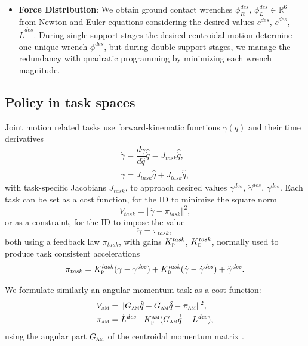 \documentclass[letterpaper, 10 pt, conference]{ieeeconf}  %
\begin{document}
\begin{itemize}
    \item[] \hspace*{-7mm}\textbf{Force Distribution}: We obtain ground contact wrenches $\phi^\mathit{des}_{R}$, $\phi^\mathit{des}_{L}\in \mathbb{R}^{6}$ from Newton and Euler equations considering the desired values $c^\mathit{des}$, $\ddot{c}^\mathit{des}$, $\dot{L}^\mathit{des}$. During single support stages the desired centroidal motion determine one unique wrench $\phi^\mathit{des}$, but during double support stages, we manage the redundancy with quadratic programming by minimizing each wrench magnitude.
    
\end{itemize}

\subsection{Policy in task spaces}
\noindent Joint motion related tasks use forward-kinematic functions $ \gamma(q) $ and their time derivatives
%
\begin{align}
    \dot{\gamma} = \dfrac{d\gamma}{d\hat{q}}\hat{\dot{q}} = J_\mathit{task}\hat{\dot{q}},\\
    \ddot{\gamma} = J_\mathit{task}\hat{\ddot{q}} + \dot{J}_\mathit{task}{\hat{\dot{q}}},
\end{align}
%
with task-specific Jacobians $J_\mathit{task}$, to approach desired values $ \gamma^\mathit{des}$, $\dot{\gamma}^\mathit{des}$, $\ddot{\gamma}^\mathit{des} $. Each task can be set as a cost function, for the ID to minimize the square norm
%
\begin{equation}
    V_\mathit{task} = \Vert \ddot{\gamma} - \pi_\mathit{task}\Vert^2,
\end{equation}
%
or as a constraint, for the ID to impose the value
%
\begin{equation}
    \ddot{\gamma} = \pi_\mathit{task},
\end{equation}
%
both using a feedback law $\pi_\mathit{task}$, with gains $ K_\textsc{p}^\mathit{task} $, $ K_\textsc{d}^\mathit{task} $, normally used to produce task consistent accelerations \cite{Sherikov2014Whole-BalanceConst}
%
\begin{equation}
    \pi_\mathit{task} = K^\mathit{task}_\textsc{p}(\gamma-\gamma^\mathit{des})+ K^\mathit{task}_\textsc{d}(\dot{\gamma}-\dot{\gamma}^\mathit{des}) + \ddot{\gamma}^\mathit{des}.
\end{equation}
%

We formulate similarly an angular momentum task as a cost function:
%
\begin{align}
    V_\textsc{am} &= \Vert G_\textsc{am}\hat{\ddot{q}}+\dot{G}_\textsc{am}\hat{\dot{q}} - \pi_\textsc{am}\Vert^2,\\
    \pi_\textsc{am} &= \dot{L}^\mathit{des} \!+\! K_\textsc{p}^\textsc{am}(G_{\textsc{am}}\hat{\dot{q}}-L^\mathit{des}),  
\end{align}
%
using the angular part $G_\textsc{am}$ of the centroidal momentum matrix \cite{Orin2008Centroidal}.
\end{document}
